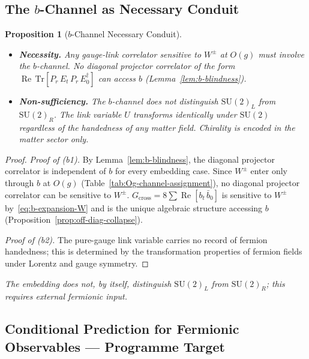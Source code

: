 \documentclass[12pt]{article}
\numberwithin{equation}{section}
\theoremstyle{plain}
\newtheorem{proposition}{Proposition}[section]
\theoremstyle{definition}
\theoremstyle{remark}
\newcommand{\su}{\mathrm{SU}}              %
\newcommand{\tr}{\mathrm{Tr}}              %
\newcommand{\Gcross}{G_{\mathrm{cross}}}   %
\begin{document}
	\subsection{The \texorpdfstring{$b$}{b}-Channel as Necessary Conduit}
	\label{sec:b-conduit}
	
	\begin{proposition}[$b$-Channel Necessary Conduit]
		\label{prop:b-conduit}
		\begin{itemize}
			\item[(b1)]
			\textbf{Necessity.}  Any gauge-link correlator sensitive to
			$W^{\pm}$ at $O(g)$ must involve the $b$-channel.  No diagonal
			projector correlator of the form
			$\operatorname{Re}\,\tr[P_{r}\, E_{t}\, P_{r}\, E_{0}^{\dagger}]$
			can access $b$ (Lemma~\ref{lem:b-blindness}).
			
			\item[(b2)]
			\textbf{Non-sufficiency.}  The $b$-channel does not
			distinguish $\su(2)_L$ from $\su(2)_R$.  The link variable
			$U$ transforms identically under $\su(2)$ regardless of the
			handedness of any matter field.  Chirality is encoded in the
			matter sector only.
		\end{itemize}
	\end{proposition}
	
	\begin{proof}
		\emph{Proof of (b1).}  By Lemma~\ref{lem:b-blindness}, the
		diagonal projector correlator is independent of $b$ for every
		embedding case.  Since $W^{\pm}$ enter only through $b$ at $O(g)$
		(Table~\ref{tab:Og-channel-assignment}), no diagonal projector
		correlator can be sensitive to $W^{\pm}$.
		$\Gcross = 8\sum\operatorname{Re}[b_t\,\bar{b}_0]$ is sensitive
		to $W^{\pm}$ by~\eqref{eq:b-expansion-W} and is the unique
		algebraic structure accessing $b$
		(Proposition~\ref{prop:off-diag-collapse}).
		
		\emph{Proof of (b2).}  The pure-gauge link variable carries no
		record of fermion handedness; this is determined by the
		transformation properties of fermion fields under Lorentz and
		gauge symmetry.
	\end{proof}
	
	\medskip
	\noindent
	\emph{The embedding does not, by itself, distinguish $\su(2)_L$ from
		$\su(2)_R$; this requires external fermionic input.}
	
	\subsection{Conditional Prediction for Fermionic Observables
		--- Programme Target}
	\label{sec:fermion-target}
	
\end{document}
